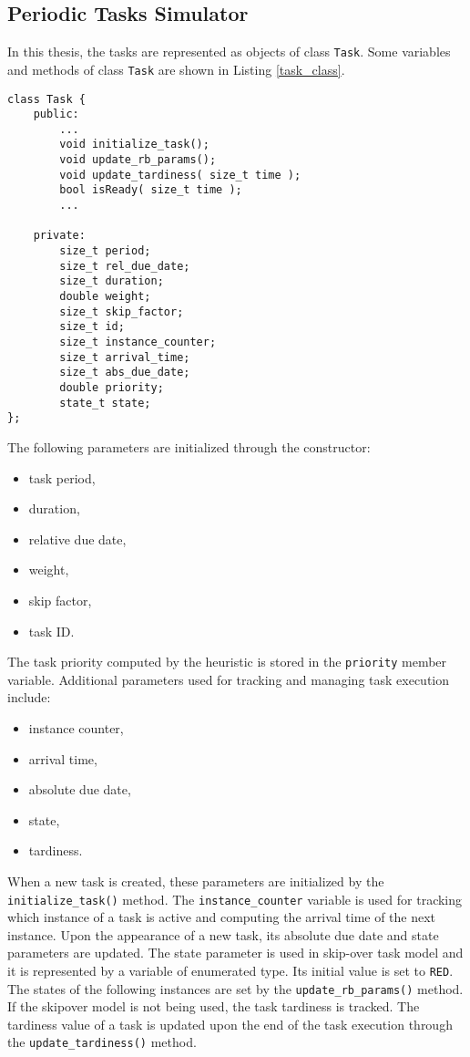 \subsection{Periodic Tasks Simulator}
In this thesis, the tasks are represented as objects of class \texttt{Task}.
Some variables and methods of class \texttt{Task} are shown in Listing \ref{task_class}.
\begin{lstlisting}[frame=none, label={task_class}, caption={Variables and methods of class \texttt{Task}.}, captionpos=b]
class Task {
	public:
		...
		void initialize_task();
		void update_rb_params();
		void update_tardiness( size_t time );
		bool isReady( size_t time );
		...

	private:
        size_t period;
        size_t rel_due_date;
        size_t duration;
        double weight;
        size_t skip_factor;
        size_t id;
		size_t instance_counter;
        size_t arrival_time;
        size_t abs_due_date;
        double priority;
        state_t state;
};
\end{lstlisting}
The following parameters are initialized through the constructor:
\begin{itemize}
	\item task period,
	\item duration,
	\item relative due date,
	\item weight,
	\item skip factor,
	\item task ID.
\end{itemize}
The task priority computed by the heuristic is stored in the \texttt{priority} member variable.
Additional parameters used for tracking and managing task execution include:
\begin{itemize}
	\item instance counter,
	\item arrival time,
	\item absolute due date,
	\item state,
	\item tardiness.
\end{itemize}
When a new task is created, these parameters are initialized by the \texttt{initialize\_task()} method.
The \texttt{instance\_counter} variable is used for tracking which instance of a task is active and computing the arrival time of the next instance.
Upon the appearance of a new task, its absolute due date and state parameters are updated.
The state parameter is used in skip-over task model and it is represented by a variable of enumerated type. Its initial value is set to \texttt{RED}.
The states of the following instances are set by the \texttt{update\_rb\_params()} method.
If the skipover model is not being used, the task tardiness is tracked.
The tardiness value of a task is updated upon the end of the task execution through the \texttt{update\_tardiness()} method.

